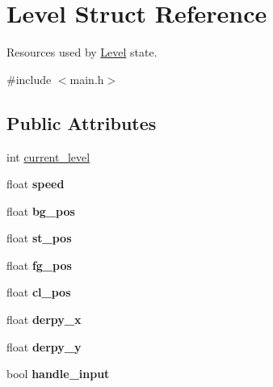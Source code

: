 \hypertarget{structLevel}{\section{\-Level \-Struct \-Reference}
\label{structLevel}
}


\-Resources used by \hyperlink{structLevel}{\-Level} state.  




{\ttfamily \#include $<$main.\-h$>$}

\subsection*{\-Public \-Attributes}
\begin{DoxyCompactItemize}
\item 
int \hyperlink{structLevel_a1ba3ee0104c912dde5d6e70fee889512}{current\-\_\-level}
\item 
\hypertarget{structLevel_a936a1d131d1e056878474ca831c5e88f}{float {\bfseries speed}}\label{structLevel_a936a1d131d1e056878474ca831c5e88f}

\item 
\hypertarget{structLevel_a00321214fdc30f67615053d1ca614948}{float {\bfseries bg\-\_\-pos}}\label{structLevel_a00321214fdc30f67615053d1ca614948}

\item 
\hypertarget{structLevel_ab13f799d9e2e06a04debbd97676fb512}{float {\bfseries st\-\_\-pos}}\label{structLevel_ab13f799d9e2e06a04debbd97676fb512}

\item 
\hypertarget{structLevel_a665bb93951ab6b7a91543712152a3acf}{float {\bfseries fg\-\_\-pos}}\label{structLevel_a665bb93951ab6b7a91543712152a3acf}

\item 
\hypertarget{structLevel_af466533be369b5ce1f48196a7f3b7b0b}{float {\bfseries cl\-\_\-pos}}\label{structLevel_af466533be369b5ce1f48196a7f3b7b0b}

\item 
\hypertarget{structLevel_ae5a97d5b61c70c63e93992a9ff3935f9}{float {\bfseries derpy\-\_\-x}}\label{structLevel_ae5a97d5b61c70c63e93992a9ff3935f9}

\item 
\hypertarget{structLevel_a7b3c0f5af134797a1ed21ef48da3ab00}{float {\bfseries derpy\-\_\-y}}\label{structLevel_a7b3c0f5af134797a1ed21ef48da3ab00}

\item 
\hypertarget{structLevel_a06cf4f2da517284d2006540051d3e5c0}{bool {\bfseries handle\-\_\-input}}\label{structLevel_a06cf4f2da517284d2006540051d3e5c0}


\end{DoxyCompactItemize}
